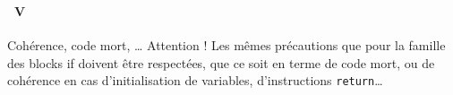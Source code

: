 \begin{frame}[containsverbatim]
  \frametitle{\secname}
  \framesubtitle{\subsecname~V}

  \begin{alertblock}{Cohérence, code mort, \ldots}
    Attention ! Les mêmes précautions que pour la famille des blocks if doivent être respectées, que ce soit en terme de code mort, ou de cohérence en cas d'initialisation
    de variables, d'instructions \verb|return|\ldots
  \end{alertblock}
\end{frame}

